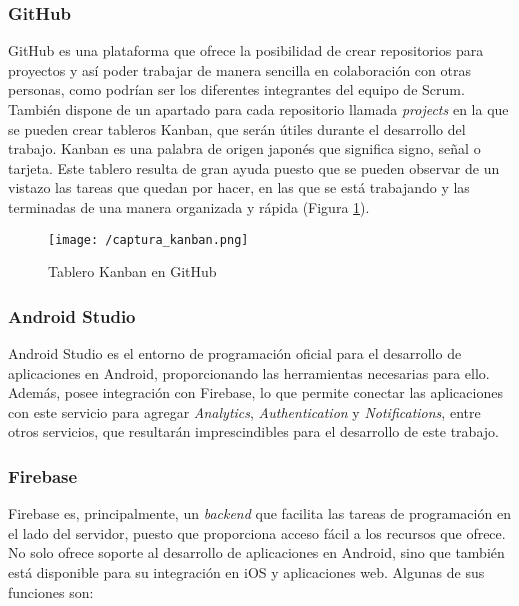 \subsubsection*{GitHub}
GitHub es una plataforma que ofrece la posibilidad de crear repositorios para proyectos y así poder trabajar de manera sencilla en colaboración con otras personas, como podrían ser los diferentes integrantes del equipo de Scrum. También dispone de un apartado para cada repositorio llamada \textit{projects} en la que se pueden crear tableros Kanban, que serán útiles durante el desarrollo del trabajo. Kanban \cite{Gomez2017} es una palabra de origen japonés que significa signo, señal o tarjeta. Este tablero resulta de gran ayuda puesto que se pueden observar de un vistazo las tareas que quedan por hacer, en las que se está trabajando y las terminadas de una manera organizada y rápida (Figura \ref{fig:kanban}).

\clearpage

\begin{figure}[!h]
	\begin{center}
		\texttt{[image: /captura\_kanban.png]}
		\caption{Tablero Kanban en GitHub}
		\label{fig:kanban}
	\end{center}
\end{figure}

\subsubsection*{Android Studio}
Android Studio \cite{AndroidStudio} es el entorno de programación oficial para el desarrollo de aplicaciones en Android, proporcionando las herramientas necesarias para ello. Además, posee integración con Firebase, lo que permite conectar las aplicaciones con este servicio para agregar \textit{Analytics}, \textit{Authentication} y \textit{Notifications}, entre otros servicios, que resultarán imprescindibles para el desarrollo de este trabajo.

\subsubsection*{Firebase}
Firebase \cite{GooFirebase} es, principalmente, un \textit{backend} que facilita las tareas de programación en el lado del servidor, puesto que proporciona acceso fácil a los recursos que ofrece. No solo ofrece soporte al desarrollo de aplicaciones en Android, sino que también está disponible para su integración en iOS y aplicaciones web. Algunas de sus funciones son:

